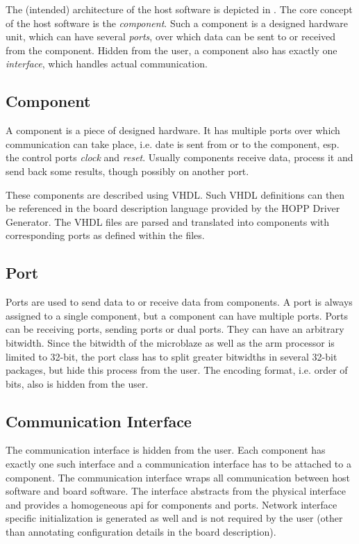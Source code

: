 \documentclass{report}
\begin{document}
The (intended) architecture of the host software is depicted in . The core concept of the host software is the \textit{component}. Such a component is a designed hardware unit, which can have several \textit{ports}, over which data can be sent to or received from the component. Hidden from the user, a component also has exactly one \textit{interface}, which handles actual communication.

\subsection{Component}
A component is a piece of designed hardware. It has multiple ports over which communication can take place, i.e. date is sent from or to the component, esp. the control ports \textit{clock} and \textit{reset}. Usually components receive data, process it and send back some results, though possibly on another port.

These components are described using VHDL. Such VHDL definitions can then be referenced in the board description language provided by the HOPP Driver Generator. The VHDL files are parsed and translated into components with corresponding ports as defined within the files.

\subsection{Port}
Ports are used to send data to or receive data from components. A port is always assigned to a single component, but a component can have multiple ports. Ports can be receiving ports, sending ports or dual ports. They can have an arbitrary bitwidth. Since the bitwidth of the microblaze as well as the arm processor is limited to 32-bit, the port class has to split greater bitwidths in several 32-bit packages, but hide this process from the user. The encoding format, i.e. order of bits, also is hidden from the user.

\subsection{Communication Interface}
The communication interface is hidden from the user. Each component has exactly one such interface and a communication interface has to be attached to a component. The communication interface wraps all communication between host software and board software. The interface abstracts from the physical interface and provides a homogeneous api for components and ports. Network interface specific initialization is generated as well and is not required by the user (other than annotating configuration details in the board description).
\end{document}
